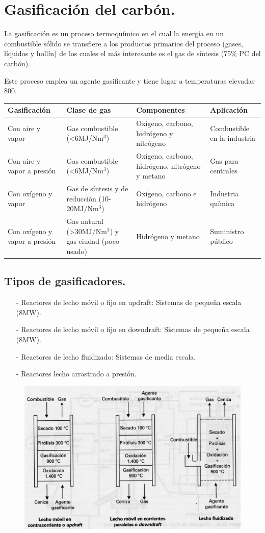 \section{Gasificación del carbón.}
La gasificación es un proceso termoquímico en el cual la energía en un combustible sólido se transfiere a los productos primarios del proceso (gases, líquidos y hollín) de los cuales el más interesante es el gas de síntesis (75\% PC del carbón).

Este proceso emplea un agente gasificante y tiene lugar a temperaturas elevadas 800\grado.
\begin{table}[H]
	\centering
	\begin{tabular}{p{3cm}p{3cm}p{3cm}p{3cm}}
		\toprule
		Gasificación&Clase de gas&Componentes&Aplicación \\
	 	\midrule
	 	Con aire y vapor				&Gas combustible (<6MJ/Nm$^3$)							& Oxígeno, carbono, hidrógeno y nitrógeno& Combustible en la industria\\
	 	Con aire y vapor a presión		&Gas combustible (<6MJ/Nm$^3$)							&Oxígeno, carbono, hidrógeno, nitrógeno y metano&Gas para centrales \\
	 	Con oxígeno y vapor				&Gas de síntesis y de reducción (10-20MJ/Nm$^3$)		&Oxígeno, carbono e hidrógeno& Industria química \\
	 	Con oxígeno y vapor a presión	&Gas natural (>30MJ/Nm$^3$)	y gas ciudad (poco usado)	&Hidrógeno y metano& Suministro público \\
		\bottomrule
	\end{tabular}
	\label{tab:4x5_table}
\end{table}

\subsection{Tipos de gasificadores.}
\begin{itemize}
	\item [-] Reactores de lecho móvil o fijo en updraft: Sistemas de pequeña escala (8MW).
	\item [-] Reactores de lecho móvil o fijo en downdraft: Sistemas de pequeña escala (8MW).
	\item [-] Reactores de lecho fluidizado: Sistemas de media escala.
	\item [-] Reactores lecho arrastrado a presión.
\end{itemize}
\begin{figure}[H]
	\centering
	\includegraphics[width=0.3\linewidth]{res/tema3/gasificad}
	\label{fig:gasificad}
\end{figure}

